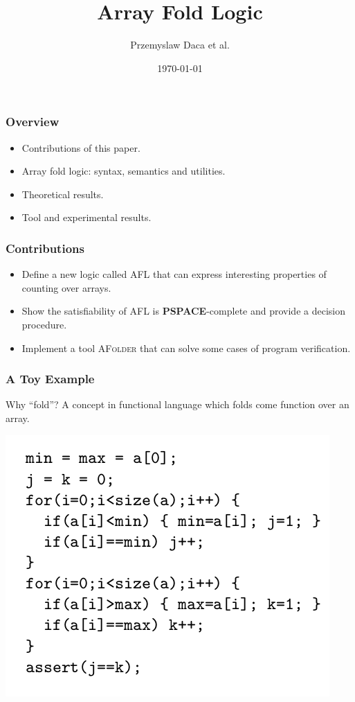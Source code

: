 \documentclass[11pt]{beamer}
\title{Array Fold Logic}
\author{Przemyslaw Daca et al.}
\date{\today}
\begin{document}
\maketitle
\begin{frame}\frametitle{Overview }
\begin{itemize}

\item Contributions of this paper.
\item Array fold logic: syntax, semantics and utilities.
\item Theoretical results.
\item Tool and experimental results.

\end{itemize}
\end{frame}

\begin{frame}\frametitle{Contributions}
\begin{itemize}
\item Define a new logic called AFL that can express interesting properties of counting over arrays.
\item Show the satisfiability of AFL is \textbf{PSPACE}-complete and provide a decision procedure.
\item Implement a tool \textsc{AFolder} that can solve some cases of program verification.
 
\end{itemize}
\end{frame}

\begin{frame}\frametitle{A Toy Example}
Why ``fold''? A concept in functional language which folds come function over an array.

\begin{example}
\begin{center}
\includegraphics[scale=0.36]{c1.png}
\end{center}
\end{example}
\end{frame}
\end{document}
